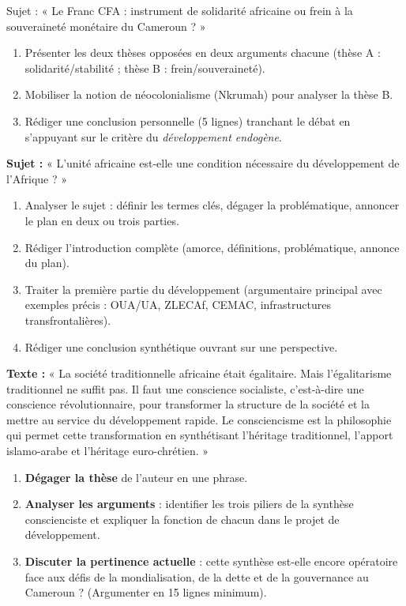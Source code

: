 \documentclass[11pt]{article}
\newcounter{popsec}
\newcounter{popsub}
\newcommand{\courssub}[1]{%
  \stepcounter{popsub}%
  \par\vspace{9pt}\noindent{\popxbold\fontsize{11.5}{13}\selectfont\color{popink}{\color{poporange}\thepopsec.\thepopsub}\hspace{6pt}#1}\par\nopagebreak\vspace{4pt}
}
\begin{document}
\begin{exercice}
Sujet : « Le Franc CFA : instrument de solidarité africaine ou frein à la souveraineté monétaire du Cameroun ? »
\begin{enumerate}
\item Présenter les deux thèses opposées en deux arguments chacune (thèse A : solidarité/stabilité ; thèse B : frein/souveraineté).
\item Mobiliser la notion de néocolonialisme (Nkrumah) pour analyser la thèse B.
\item Rédiger une conclusion personnelle (5 lignes) tranchant le débat en s'appuyant sur le critère du \emph{développement endogène}.
\end{enumerate}
\end{exercice}

\courssub{Je me prépare au Bac}

\begin{exercice}
\textbf{Sujet :} « L'unité africaine est-elle une condition nécessaire du développement de l'Afrique ? »
\begin{enumerate}
\item Analyser le sujet : définir les termes clés, dégager la problématique, annoncer le plan en deux ou trois parties.
\item Rédiger l'introduction complète (amorce, définitions, problématique, annonce du plan).
\item Traiter la première partie du développement (argumentaire principal avec exemples précis : OUA/UA, ZLECAf, CEMAC, infrastructures transfrontalières).
\item Rédiger une conclusion synthétique ouvrant sur une perspective.
\end{enumerate}
\end{exercice}

\begin{exercice}
\textbf{Texte :} « La société traditionnelle africaine était égalitaire. Mais l'égalitarisme traditionnel ne suffit pas. Il faut une conscience socialiste, c'est-à-dire une conscience révolutionnaire, pour transformer la structure de la société et la mettre au service du développement rapide. Le consciencisme est la philosophie qui permet cette transformation en synthétisant l'héritage traditionnel, l'apport islamo-arabe et l'héritage euro-chrétien. »
\begin{enumerate}
\item \textbf{Dégager la thèse} de l'auteur en une phrase.
\item \textbf{Analyser les arguments} : identifier les trois piliers de la synthèse conscienciste et expliquer la fonction de chacun dans le projet de développement.
\item \textbf{Discuter la pertinence actuelle} : cette synthèse est-elle encore opératoire face aux défis de la mondialisation, de la dette et de la gouvernance au Cameroun ? (Argumenter en 15 lignes minimum).
\end{enumerate}
\end{exercice}
\end{document}
